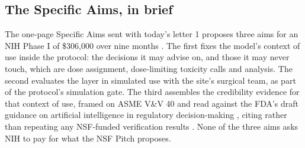 \subsection{The Specific Aims, in brief}

The one-page Specific Aims sent with today's letter 1 proposes three aims for an
NIH Phase I of \$306,000 over nine months \cite{capitalplan2026}. The first fixes
the model's context of use inside the protocol: the decisions it may advise on,
and those it may never touch, which are dose assignment, dose-limiting toxicity
calls and analysis. The second evaluates the layer in simulated use with the
site's surgical team, as part of the protocol's simulation gate. The third
assembles the credibility evidence for that context of use, framed on ASME V\&V
40 \cite{asmevv40} and read against the FDA's draft guidance on artificial
intelligence in regulatory decision-making \cite{fdaaiguidance2025}, citing
rather than repeating any NSF-funded verification results \cite{nsf26510}. None
of the three aims asks NIH to pay for what the NSF Pitch proposes.
